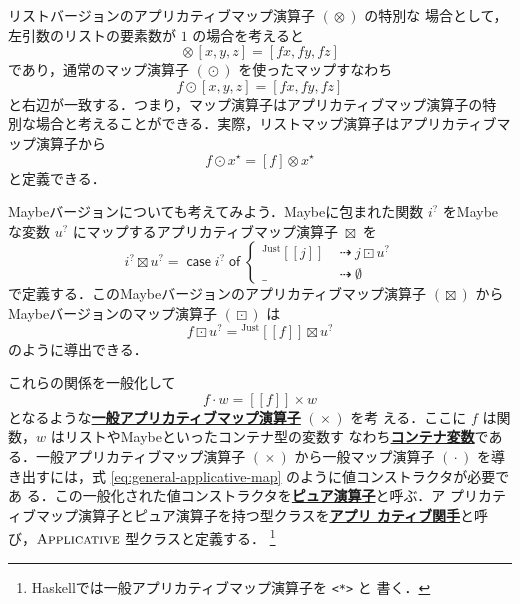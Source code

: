 \documentclass[a5paper,twoside,fleqn,draft]{jsbook}
\def\[{[\![}
\def\]{]\!]}
\newcommand{\programminglanguage}[1]{\textsf{#1}}
\newcommand{\haskell}{\programminglanguage{Haskell}}
\newcommand{\keyword}[1]{{\underline{\textbf{#1}}}}
\newcommand{\code}[1]{\texttt{#1}}
\newcommand{\mKeyword}[1]{\mathsf{#1}}
\newcommand{\mIfKeyword}{\mKeyword{if}}
\newcommand{\mCaseKeyword}{\mKeyword{case}}
\newcommand{\mOfKeyword}{\mKeyword{of}}
\newcommand{\mOtherwiseKeyword}{\mKeyword{otherwise}}
\DeclareMathOperator{\mCaseKW}{\mCaseKeyword}
\DeclareMathOperator{\mIf}{\mIfKeyword}
\DeclareMathOperator{\mOfKW}{\mOfKeyword}
\DeclareMathOperator{\mOtherwise}{\mOtherwiseKeyword}
\newcommand{\mNothing}{\emptyset}
\DeclareMathOperator{\mAppMap}{\times}
\DeclareMathOperator{\mAppMapList}{\otimes}
\DeclareMathOperator{\mAppMapMaybe}{\boxtimes}
\DeclareMathOperator{\mIfSo}{\dashrightarrow}
\DeclareMathOperator{\mLogicalAnd}{\wedge}
\DeclareMathOperator{\mMap}{\cdot}
\DeclareMathOperator{\mMapList}{\odot}
\DeclareMathOperator{\mMapMaybe}{\boxdot}
\newcommand{\mValueConstructor}[1]{\mathrm{#1}}
\newcommand{\mValueWith}[2]{{}^\mValueConstructor{#1}\[#2\]}
\newcommand{\mJustWith}[1]{\mValueWith{Just}{#1}}
\newcommand{\mPureWith}[1]{\[#1\]}
\newcommand{\mTypeClass}[1]{\textsc{#1}} %
\newcommand{\mApplicativeTypeClass}{\mTypeClass{Applicative}}
\newcommand{\mList}[1]{{#1}^\mathrm{\star}}
\newcommand{\mMaybe}[1]{{#1}^?}
\newcommand{\mCaseOf}[1]{\mCaseKW#1\mOfKW}
\begin{document}
リストバージョンのアプリカティブマップ演算子 $(\mAppMapList)$ の特別な
場合として，左引数のリストの要素数が $1$ の場合を考えると
\begin{equation}
  [f]\mAppMapList{}[x,y,z]
  =[fx,fy,fz]
\end{equation}
であり，通常のマップ演算子 $(\mMapList)$ を使ったマップすなわち
\begin{equation}
  f\mMapList{}[x,y,z]
  =[fx,fy,fz]
\end{equation}
と右辺が一致する．つまり，マップ演算子はアプリカティブマップ演算子の特
別な場合と考えることができる．実際，リストマップ演算子はアプリカティブマップ演算子から
\begin{equation}
  f\mMapList\mList{x}
  =[f]\mAppMapList\mList{x}
\end{equation}
と定義できる．

Maybeバージョンについても考えてみよう．Maybeに包まれた関数 $\mMaybe{i}$
をMaybeな変数 $\mMaybe{u}$ にマップするアプリカティブマップ演算子
$\mAppMapMaybe$ を
\begin{equation}
  \mMaybe{i}\mAppMapMaybe\mMaybe{u}
  =\mCaseOf{\mMaybe{i}}
  \begin{cases}
    \mJustWith{j}
    &\mIfSo j\mMapMaybe\mMaybe{u}\\
    \_
    &\mIfSo\mNothing
  \end{cases}
\end{equation}
で定義する．このMaybeバージョンのアプリカティブマップ演算子
$(\mAppMapMaybe)$ からMaybeバージョンのマップ演算子 $(\mMapMaybe)$ は
\begin{equation}
  f\mMapMaybe\mMaybe{u}
  =\mJustWith{f}\mAppMapMaybe\mMaybe{u}
\end{equation}
のように導出できる．

これらの関係を一般化して
\begin{equation}
  \label{eq:general-applicative-map}
  f\mMap w
  =\mPureWith{f}\mAppMap w
\end{equation}
となるような\keyword{一般アプリカティブマップ演算子} $(\mAppMap)$ を考
える．ここに $f$ は関数，$w$ はリストやMaybeといったコンテナ型の変数す
なわち\keyword{コンテナ変数}である．一般アプリカティブマップ演算子
$(\mAppMap)$ から一般マップ演算子 $(\mMap)$ を導き出すには，式
\eqref{eq:general-applicative-map} のように値コンストラクタが必要であ
る．この一般化された値コンストラクタを\keyword{ピュア演算子}と呼ぶ．ア
プリカティブマップ演算子とピュア演算子を持つ型クラスを\keyword{アプリ
  カティブ関手}と呼び，$\mApplicativeTypeClass$ 型クラスと定義する．
\footnote{\haskell では一般アプリカティブマップ演算子を \code{<*>} と
  書く．}
\end{document}
